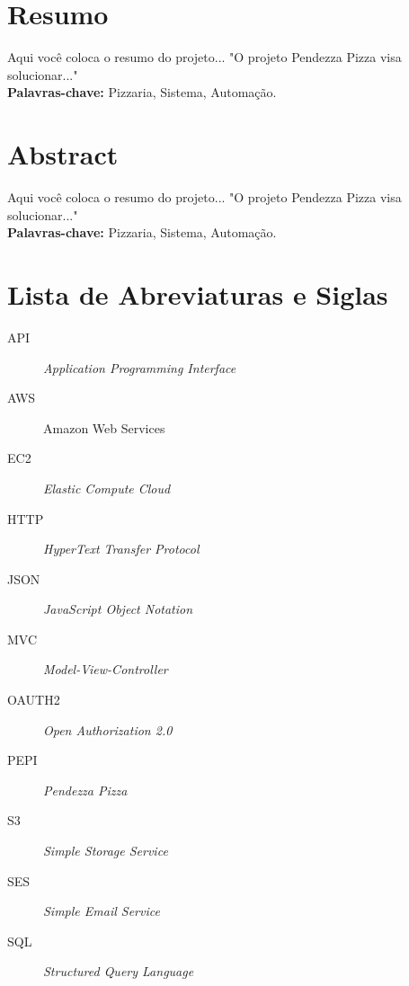 \documentclass[12pt, a4paper]{article}
\begin{document}
\newpage
\section*{Resumo}
Aqui você coloca o resumo do projeto... "O projeto Pendezza Pizza visa solucionar..."
\vspace{1cm}
\\ \textbf{Palavras-chave:} Pizzaria, Sistema, Automação.

\newpage
\section*{Abstract}
Aqui você coloca o resumo do projeto... "O projeto Pendezza Pizza visa solucionar..."
\vspace{1cm}
\\ \textbf{Palavras-chave:} Pizzaria, Sistema, Automação.

\newpage
\listoffigures

\newpage
\section*{Lista de Abreviaturas e Siglas}

\begin{description}
    \item[API] \textit{Application Programming Interface} 
    \item[AWS] Amazon Web Services
    \item[EC2] \textit{Elastic Compute Cloud}
    \item[HTTP] \textit{HyperText Transfer Protocol}
    \item[JSON] \textit{JavaScript Object Notation}
    \item[MVC] \textit{Model-View-Controller}
    \item[OAUTH2] \textit{Open Authorization 2.0}
    \item[PEPI] \textit{Pendezza Pizza} 
    \item[S3] \textit{Simple Storage Service}
    \item[SES] \textit{Simple Email Service}
    \item[SQL] \textit{Structured Query Language}
\end{description}

\newpage
\tableofcontents

\end{document}
